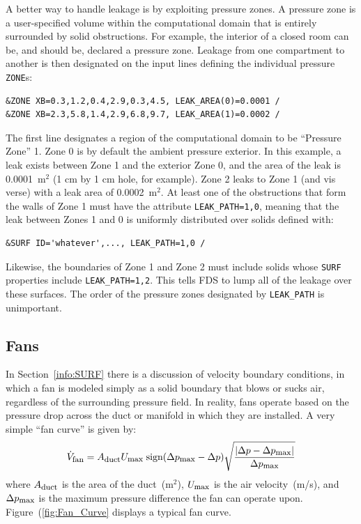 \documentclass[11pt]{book}
\newcommand{\ct}{\tt\small}
\newcommand{\be}{\begin{equation}}
\newcommand{\ee}{\end{equation}}
\begin{document}
A better way to handle leakage is by exploiting pressure zones. A pressure zone is a user-specified volume within the computational domain that is
entirely surrounded by solid obstructions. For example, the interior of a closed room can be, and should be, declared a pressure zone. Leakage from one
compartment to another is then designated on the input lines defining the individual pressure {\ct ZONE}s:

\footnotesize
\begin{verbatim}
&ZONE XB=0.3,1.2,0.4,2.9,0.3,4.5, LEAK_AREA(0)=0.0001 /
&ZONE XB=2.3,5.8,1.4,2.9,6.8,9.7, LEAK_AREA(1)=0.0002 /
\end{verbatim}
\normalsize

\noindent
The first line designates a region of the computational domain to be ``Pressure Zone'' 1.
Zone 0 is by default the ambient pressure exterior.
In this example, a leak exists between Zone 1 and the exterior Zone 0, and the area of the leak
is 0.0001~m$^2$ (1 cm by 1 cm hole, for example). Zone 2 leaks to Zone 1 (and vis verse)
with a leak area of 0.0002~m$^2$.
At least one of the obstructions that form the walls of Zone 1 must have the attribute
{\ct LEAK\_PATH=1,0}, meaning that the leak between Zones 1 and 0 is uniformly distributed
over solids defined with:

\footnotesize
\begin{verbatim}
&SURF ID='whatever',..., LEAK_PATH=1,0 /
\end{verbatim}
\normalsize

\noindent
Likewise, the boundaries of Zone 1 and Zone 2 must include solids whose {\ct SURF} properties include {\ct LEAK\_PATH=1,2}. This tells FDS to lump all of the
leakage over these surfaces. The order of the pressure zones designated by {\ct LEAK\_PATH} is unimportant.




\subsection{Fans}
\label{info:Fans}

In Section~\ref{info:SURF} there is a discussion of velocity boundary conditions, in which a fan is modeled simply as a solid boundary that blows or
sucks air, regardless of the surrounding pressure field. In reality, fans operate based on the pressure drop across the duct or manifold in which they are
installed. A very simple ``fan curve'' is given by:
\be \dot{V}_{\hbox{\footnotesize fan}} = A_{\hbox{\footnotesize duct}} U_{\hbox{\footnotesize max}} \;
   \hbox{sign} (\Delta p_{\hbox{\footnotesize max}}-\Delta p)
   \sqrt{ \frac{ |\Delta p - \Delta p_{\hbox{\footnotesize max}}|}{\Delta p_{\hbox{\footnotesize max}} } }  \ee
where $A_{\hbox{\footnotesize duct}}$ is the area of the duct~(m$^2$), $U_{\hbox{\footnotesize max}}$ is the air velocity~(m/s), and $\Delta p_{\hbox{\footnotesize max}}$ is the maximum
pressure difference the fan can operate upon. Figure~(\ref{fig:Fan_Curve} displays a typical fan curve.
\end{document}
